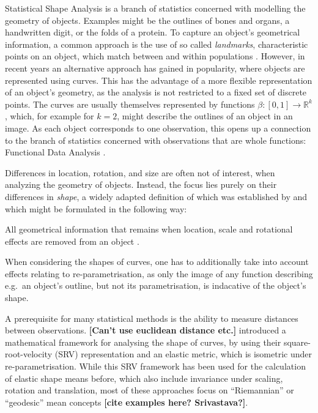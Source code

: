 Statistical Shape Analysis \parencite[see e.g.][]{DrydenMardia2016} is a branch of statistics concerned with modelling the geometry of objects.
Examples might be the outlines of bones and organs, a handwritten digit, or the folds of a protein.
To capture an object's geometrical information, a common approach is the use of so called \textit{landmarks}, characteristic points on an object, which match between and within populations \parencite[see][3]{DrydenMardia2016}.
However, in recent years an alternative approach has gained in popularity, where objects are represented using curves.
This has the advantage of a more flexible representation of an object's geometry, as the analysis is not restricted to a fixed set of discrete points.
The curves are usually themselves represented by functions $\beta : [0,1] \rightarrow \mathbb{R}^k$, which, for example for $k = 2$, might describe the outlines of an object in an image. 
As each object corresponds to one observation, this opens up a connection to the branch of statistics concerned with observations that are whole functions: Functional Data Analysis \parencite[see e.g.][]{RamsaySilverman2005}.

Differences in location, rotation, and size are often not of interest, when analyzing the geometry of objects.
Instead, the focus lies purely on their differences in  \textit{shape}, a widely adapted definition of which was established by \cite{Kendall1977} and which might be formulated in the following way:
\begin{definition}[Shape] 
    All geometrical information that remains when location, scale and rotational effects are removed from an object \parencite[see][1]{DrydenMardia2016}.
\end{definition}
\noindent When considering the shapes of curves, one has to additionally take into account effects relating to re-parametrisation, as only the image of any function describing e.g.\ an object's outline, but not its parametrisation, is indacative of the object's shape.

A prerequisite for many statistical methods is the ability to measure distances between observations.
\textbf{[Can't use euclidean distance etc.]}
\cite{SrivastavaEtAl2011} introduced a mathematical framework for analysing the shape of curves, by using their square-root-velocity (SRV) representation and an elastic metric, which is isometric under re-parametrisation.
While this SRV framework has been used for the calculation of elastic shape means before, which also include invariance under scaling, rotation and translation, most of these approaches focus on \enquote{Riemannian} or \enquote{geodesic} mean concepts \textbf{[cite examples here? Srivastava?]}.

